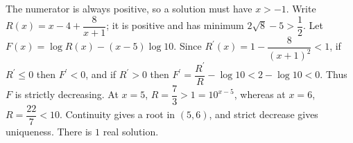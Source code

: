 The numerator is always positive, so a solution must have $x>-1$. Write $R(x)=x-4+\dfrac{8}{x+1}$; it is positive and has minimum $2\sqrt8-5>\dfrac{1}{2}$. Let $F(x)=\log R(x)-(x-5)\log10$. Since $R^{\prime}(x)=1-\dfrac{8}{(x+1)^2}<1$, if $R^{\prime}\le0$ then $F^{\prime}<0$, and if $R^{\prime}>0$ then $F^{\prime}=\dfrac{R^{\prime}}{R}-\log10<2-\log10<0$. Thus $F$ is strictly decreasing. At $x=5$, $R=\dfrac{7}{3}>1=10^{x-5}$, whereas at $x=6$, $R=\dfrac{22}{7}<10$. Continuity gives a root in $(5,6)$, and strict decrease gives uniqueness. There is $\boxed1$ real solution.
